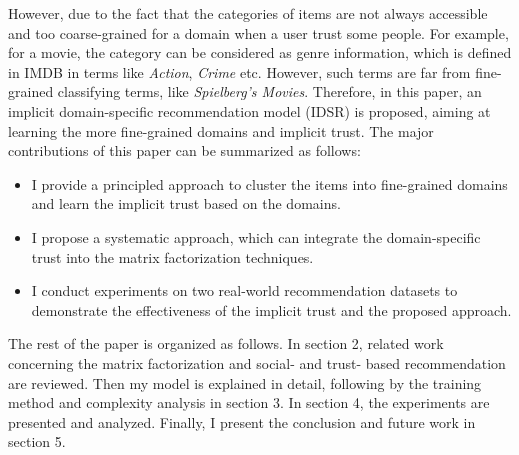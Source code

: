 However, due to the fact that the categories of items are not always accessible and too coarse-grained for a domain when a user trust some people. For example, for a movie, the category can be considered as genre information, which is defined in IMDB in terms like \emph{Action}, \emph{Crime} etc. However, such terms are far from fine-grained classifying terms, like \emph{Spielberg's Movies}. Therefore, in this paper, an implicit domain-specific recommendation model (IDSR) is proposed, aiming at learning the more fine-grained domains and implicit trust. The major contributions of this paper can be summarized as follows:
\begin{itemize}
	\item I provide a principled approach to cluster the items into fine-grained domains and learn the implicit trust based on the domains.
	\item I propose a systematic approach, which can integrate the domain-specific trust into the matrix factorization techniques.
	\item I conduct experiments on two real-world recommendation datasets to demonstrate the effectiveness of the implicit trust and the proposed approach.
\end{itemize}

The rest of the paper is organized as follows. In section 2, related work concerning the matrix factorization and social- and trust- based recommendation are reviewed. Then my model is explained in detail, following by the training method and complexity analysis in section 3. In section 4, the experiments are presented and analyzed. Finally, I present the conclusion and future work in section 5.


